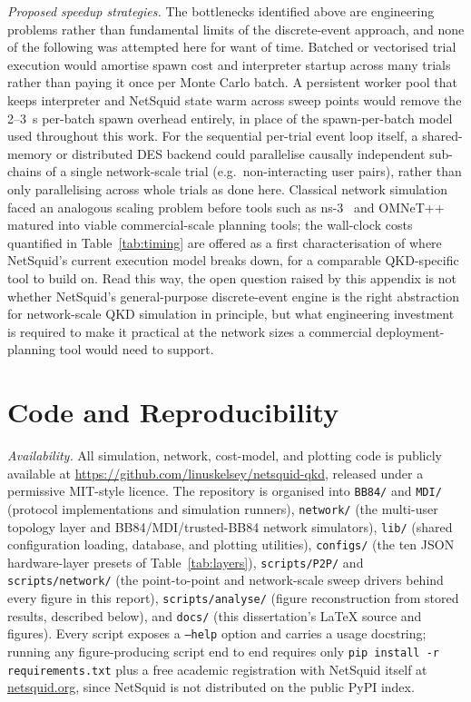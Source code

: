 \documentclass[12pt]{article}
\let\oldsection\section
\renewcommand{\section}{\clearpage\oldsection}
\begin{document}
\textit{Proposed speedup strategies.} The bottlenecks identified above are engineering problems rather than fundamental limits of the discrete-event approach, and none of the following was attempted here for want of time. Batched or vectorised trial execution would amortise spawn cost and interpreter startup across many trials rather than paying it once per Monte Carlo batch. A persistent worker pool that keeps interpreter and NetSquid state warm across sweep points would remove the 2--3~s per-batch spawn overhead entirely, in place of the spawn-per-batch model used throughout this work. For the sequential per-trial event loop itself, a shared-memory or distributed DES backend could parallelise causally independent sub-chains of a single network-scale trial (e.g.\ non-interacting user pairs), rather than only parallelising across whole trials as done here. Classical network simulation faced an analogous scaling problem before tools such as ns-3~\cite{henderson2008network} and OMNeT++~\cite{varga2001omnet++} matured into viable commercial-scale planning tools; the wall-clock costs quantified in Table~\ref{tab:timing} are offered as a first characterisation of where NetSquid's current execution model breaks down, for a comparable QKD-specific tool to build on. Read this way, the open question raised by this appendix is not whether NetSquid's general-purpose discrete-event engine is the right abstraction for network-scale QKD simulation in principle, but what engineering investment is required to make it practical at the network sizes a commercial deployment-planning tool would need to support.

\section{Code and Reproducibility}
\label{sec:appendix_code}

\textit{Availability.} All simulation, network, cost-model, and plotting code is publicly available at \url{https://github.com/linuskelsey/netsquid-qkd}, released under a permissive MIT-style licence. The repository is organised into \texttt{BB84/} and \texttt{MDI/} (protocol implementations and simulation runners), \texttt{network/} (the multi-user topology layer and BB84/MDI/trusted-BB84 network simulators), \texttt{lib/} (shared configuration loading, database, and plotting utilities), \texttt{configs/} (the ten JSON hardware-layer presets of Table~\ref{tab:layers}), \texttt{scripts/P2P/} and \texttt{scripts/network/} (the point-to-point and network-scale sweep drivers behind every figure in this report), \texttt{scripts/analyse/} (figure reconstruction from stored results, described below), and \texttt{docs/} (this dissertation's \LaTeX{} source and figures). Every script exposes a \texttt{--help} option and carries a usage docstring; running any figure-producing script end to end requires only \texttt{pip install -r requirements.txt} plus a free academic registration with NetSquid itself at \url{netsquid.org}, since NetSquid is not distributed on the public PyPI index.
\end{document}

